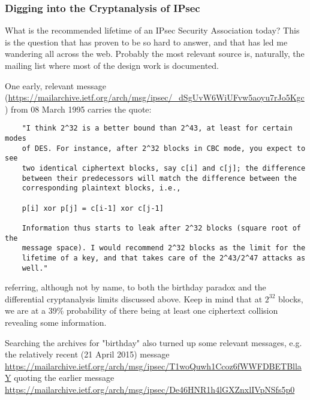 \subsubsection{Digging into the Cryptanalysis of IPsec}
\label{sec:ipsec-cryptan}


What is the recommended lifetime of an IPsec Security Association
today?  This is the question that has proven to be so hard to answer,
and that has led me wandering all across the web.  Probably the most
relevant source is, naturally, the mailing list where most of the
design work is documented.

One early, relevant message
(\url{https://mailarchive.ietf.org/arch/msg/ipsec/_dSgUvW6WiUFvw5aoyu7rJo5Kgc})
from 08 March 1995 carries the quote:

\begin{widetext}
\begin{verbatim}
	"I think 2^32 is a better bound than 2^43, at least for certain modes
	of DES. For instance, after 2^32 blocks in CBC mode, you expect to see
	two identical ciphertext blocks, say c[i] and c[j]; the difference
	between their predecessors will match the difference between the
	corresponding plaintext blocks, i.e.,

	p[i] xor p[j] = c[i-1] xor c[j-1]

	Information thus starts to leak after 2^32 blocks (square root of the
	message space). I would recommend 2^32 blocks as the limit for the
	lifetime of a key, and that takes care of the 2^43/2^47 attacks as
	well."
\end{verbatim}
\end{widetext}
referring, although not by name, to both the birthday paradox and the
differential cryptanalysis limits discussed above.  Keep in mind that
at $2^{32}$ blocks, we are at a 39\% probability of there being at least
one ciphertext collision revealing some information.

Searching the archives for "birthday" also turned up some relevant
messages, e.g. the relatively recent (21 April 2015) message
\url{https://mailarchive.ietf.org/arch/msg/ipsec/T1woQuwh1Ccoz6fWWFDBETBllaY}
quoting the earlier message
\url{https://mailarchive.ietf.org/arch/msg/ipsec/De46HNR1h4lGXZnxlIVpNSfs5p0}

